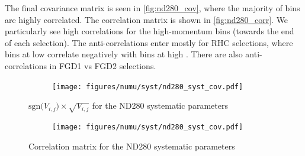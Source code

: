 The final covariance matrix is seen in \autoref{fig:nd280_cov}, where the majority of bins are highly correlated. The correlation matrix is shown in \autoref{fig:nd280_corr}. We particularly see high correlations for the high-momentum bins (towards the end of each selection). The anti-correlations enter mostly for RHC selections, where bins at low \pmu correlate negatively with bins at high \pmu. There are also anti-correlations in FGD1 vs FGD2 selections.
\begin{figure}[h]
	\begin{subfigure}[t]{0.70\textwidth}
		\texttt{[image: figures/numu/syst/nd280\_syst\_cov.pdf]}
	\end{subfigure}
\caption{$\text{sgn(}V_{i,j}\text{)}\times\sqrt{V_{i,j}}$ for the ND280 systematic parameters}
\label{fig:nd280_cov}
\end{figure}
\begin{figure}[h]
	\begin{subfigure}[t]{0.70\textwidth}
		\texttt{[image: figures/numu/syst/nd280\_syst\_cov.pdf]}
	\end{subfigure}
\caption{Correlation matrix for the ND280 systematic parameters}
\label{fig:nd280_corr}
\end{figure}

